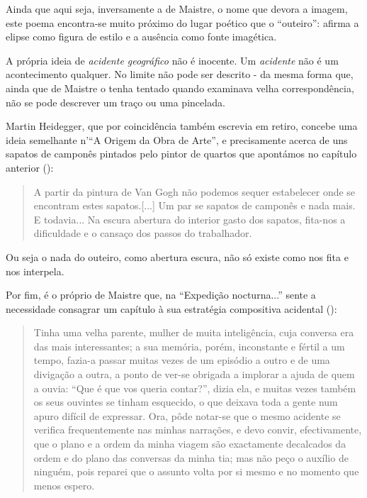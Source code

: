 \documentclass[12pt]{article}
\begin{document}
Ainda que aqui seja, inversamente a de Maistre, o nome que devora a
imagem, este poema encontra-se muito próximo do lugar poético que o
``outeiro'': afirma a elipse como figura de estilo e a ausência como
fonte imagética.

A própria ideia de \emph{acidente geográfico} não é inocente. Um
\emph{acidente} não é um acontecimento qualquer. No limite não pode
ser descrito - da mesma forma que, ainda que de Maistre o tenha
tentado quando examinava velha correspondência, não se pode descrever
um traço ou uma pincelada.

Martin Heidegger, que por coincidência também escrevia em retiro,
concebe uma ideia semelhante n'``A Origem da Obra de Arte'', e
precisamente acerca de uns sapatos de camponês pintados pelo pintor de
quartos que apontámos no capítulo anterior (\cite[p.xxx?]{heidegger}):

\begin{quote}
  A partir da pintura de Van Gogh não podemos sequer estabelecer onde
  se encontram estes sapatos.[...] Um par se sapatos de camponês e
  nada mais. E todavia...  Na escura abertura do interior gasto dos
  sapatos, fita-nos a dificuldade e o cansaço dos passos do
  trabalhador.
\end{quote} 

Ou seja o nada do outeiro, como abertura escura, não só existe como
nos fita e nos interpela.

Por fim, é o próprio de Maistre que, na ``Expedição nocturna...''
sente a necessidade consagrar um capítulo à sua estratégia compositiva
acidental (\cite[p.xxx?]{demaistre}):

\begin{quote}
  Tinha uma velha parente, mulher de muita inteligência, cuja conversa
  era das mais interessantes; a sua memória, porém, inconstante e
  fértil a um tempo, fazia-a passar muitas vezes de um episódio a
  outro e de uma divigação a outra, a ponto de ver-se obrigada a
  implorar a ajuda de quem a ouvia: ``Que é que vos queria contar?'',
  dizia ela, e muitas vezes também os seus ouvintes se tinham
  esquecido, o que deixava toda a gente num apuro difícil de
  expressar. Ora, pôde notar-se que o mesmo acidente se verifica
  frequentemente nas minhas narrações, e devo convir, efectivamente,
  que o plano e a ordem da minha viagem são exactamente decalcados da
  ordem e do plano das conversas da minha tia; mas não peço o auxílio
  de ninguém, pois reparei que o assunto volta por si mesmo e no
  momento que menos espero.
\end{quote}
\end{document}
